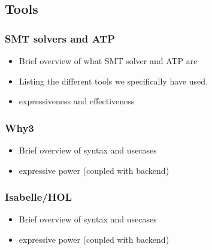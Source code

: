 \subsection{Tools}

\subsubsection{SMT solvers and ATP}
\begin{itemize}
  \item Brief overview of what SMT solver and ATP are
  \item Listing the different tools we specifically have used.
  \item expressiveness and effectiveness
\end{itemize}

\subsubsection{Why3}\label{sec:why3}
\begin{itemize}
  \item Brief overview of syntax and usecases
  \item expressive power (coupled with backend)
\end{itemize}

\subsubsection{Isabelle/HOL}\label{sec:isabelle}
\begin{itemize}
  \item Brief overview of syntax and usecases
  \item expressive power (coupled with backend)
\end{itemize}
